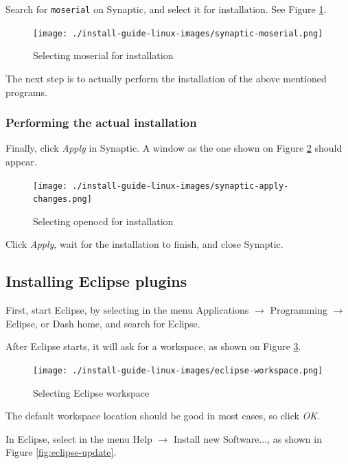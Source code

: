 \documentclass[a4paper, 10pt]{article}
\begin{document}
Search for \verb+moserial+ on Synaptic, and select it for installation.
See Figure \ref{fig:synaptic-moserial}.


    \begin{figure}[H]
    \centering
        \texttt{[image: ./install-guide-linux-images/synaptic-moserial.png]}
        \caption{Selecting moserial for installation}
        \label{fig:synaptic-moserial}
    \end{figure}


The next step is to actually perform the installation of the above mentioned programs.

\subsubsection{Performing the actual installation}

Finally, click \emph{Apply} in Synaptic.
A window as the one shown on Figure \ref{fig:synaptic-apply-changes.png}
should appear.

    \begin{figure}[H]
    \centering
        \texttt{[image: ./install-guide-linux-images/synaptic-apply-changes.png]}
        \caption{Selecting openocd for installation}
        \label{fig:synaptic-apply-changes.png}
    \end{figure}

Click \emph{Apply}, wait for the installation to finish, and close Synaptic.

\subsection{Installing Eclipse plugins}

First, start Eclipse, by selecting in the menu Applications $\rightarrow$
Programming $\rightarrow$ Eclipse,
or Dash home, and search for Eclipse.

After Eclipse starts, it will ask for a workspace, as shown on Figure \ref{fig:eclipse-workspace}.

    \begin{figure}[H]
    \centering
        \texttt{[image: ./install-guide-linux-images/eclipse-workspace.png]}
        \caption{Selecting Eclipse workspace}
        \label{fig:eclipse-workspace}
    \end{figure}

The default workspace location should be good in most cases, so click \emph{OK}.

In Eclipse, select in the menu Help $\rightarrow$ Install new Software..., as shown in
Figure \ref{fig:eclipse-update}.
\end{document}
